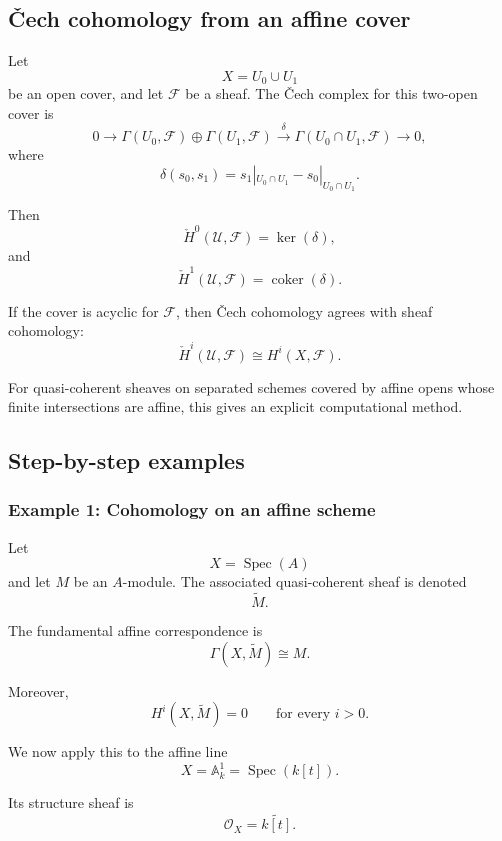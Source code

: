\documentclass[12pt,a4paper]{article}
\theoremstyle{notespace}
\begin{document}
\subsection{Čech cohomology from an affine cover}

Let
\[
X=U_{0}\cup U_{1}
\]
be an open cover, and let \(\mathcal{F}\) be a sheaf. The Čech complex for
this two-open cover is
\[
0
\longrightarrow
\Gamma(U_{0},\mathcal{F})
\oplus
\Gamma(U_{1},\mathcal{F})
\xrightarrow{\delta}
\Gamma(U_{0}\cap U_{1},\mathcal{F})
\longrightarrow
0,
\]
where
\[
\delta(s_{0},s_{1})
=
s_{1}|_{U_{0}\cap U_{1}}
-
s_{0}|_{U_{0}\cap U_{1}}.
\]

Then
\[
\check{H}^{0}(\mathcal{U},\mathcal{F})
=
\ker(\delta),
\]
and
\[
\check{H}^{1}(\mathcal{U},\mathcal{F})
=
\operatorname{coker}(\delta).
\]

If the cover is acyclic for \(\mathcal{F}\), then Čech cohomology agrees
with sheaf cohomology:
\[
\check{H}^{i}(\mathcal{U},\mathcal{F})
\cong
H^{i}(X,\mathcal{F}).
\]

For quasi-coherent sheaves on separated schemes covered by affine opens whose
finite intersections are affine, this gives an explicit computational
method.

\subsection{Step-by-step examples}

\subsubsection{Example 1: Cohomology on an affine scheme}

Let
\[
X=\operatorname{Spec}(A)
\]
and let \(M\) be an \(A\)-module. The associated quasi-coherent sheaf is
denoted
\[
\widetilde{M}.
\]

The fundamental affine correspondence is
\[
\Gamma(X,\widetilde{M})\cong M.
\]

Moreover,
\[
H^{i}(X,\widetilde{M})=0
\qquad
\text{for every } i>0.
\]

We now apply this to the affine line
\[
X=\mathbb{A}^{1}_{k}
=
\operatorname{Spec}(k[t]).
\]

Its structure sheaf is
\[
\mathcal{O}_{X}
=
\widetilde{k[t]}.
\]
\end{document}
